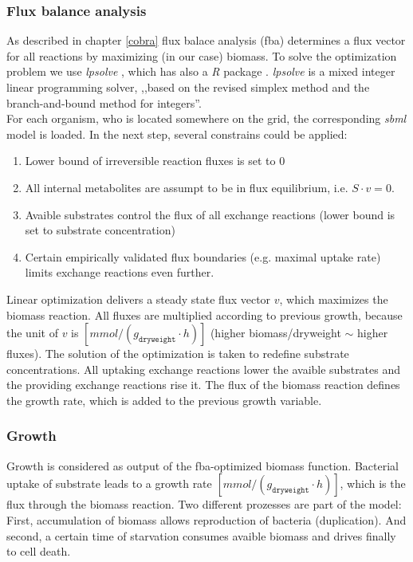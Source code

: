 \subsubsection{Flux balance analysis}
As described in chapter \ref{cobra} flux balace analysis (fba) determines a flux vector for all reactions by maximizing (in our case) biomass.
To solve the optimization problem we use \textit{lpsolve} \cite{lpsolve}, which has also a \textit{R} package \cite{Rlpsolve}.
\textit{lpsolve} is a mixed integer linear programming solver, ,,based on the revised simplex method and the branch-and-bound method for integers''.\cite{lpsolvedocu}\\
For each organism, who is located somewhere on the grid, the corresponding \textit{sbml} model is loaded.
In the next step, several constrains could be applied:
\begin{enumerate}
  \item Lower bound of irreversible reaction fluxes is set to $0$
  \item All internal metabolites are assumpt to be in flux equilibrium, i.e. $S\cdot v=0$.
  \item Avaible substrates control the flux of all exchange reactions (lower bound is set to substrate concentration)
  \item Certain empirically validated flux boundaries (e.g. maximal uptake rate) limits exchange reactions even further.
\end{enumerate}
Linear optimization delivers a steady state flux vector $v$, which maximizes the biomass reaction.
All fluxes are multiplied according to previous growth, because the unit of $v$ is $[mmol/(g_{\texttt{dryweight}}\cdot h)]$ (higher biomass/dryweight $\sim$ higher fluxes).
The solution of the optimization is taken to redefine substrate concentrations.
All uptaking exchange reactions lower the avaible substrates and the providing exchange reactions rise it.
The flux of the biomass reaction defines the growth rate, which is added to the previous growth variable.

\subsubsection{Growth}
Growth is considered as output of the fba-optimized biomass function.
Bacterial uptake of substrate leads to a growth rate $[mmol/(g_{\texttt{dryweight}}\cdot h)]$, which is the flux through the biomass reaction.
Two different prozesses are part of the model: 
First, accumulation of biomass allows reproduction of bacteria (duplication).
And second, a certain time of starvation consumes avaible biomass and drives finally to cell death.
